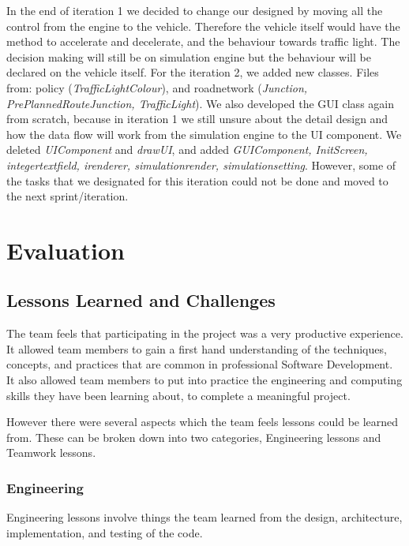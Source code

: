 \documentclass[11pt]{article}
\begin{document}
In the end of iteration 1 we decided to change our designed by moving all the control from the engine to the vehicle. Therefore the vehicle itself would have the method to accelerate and decelerate, and the behaviour towards traffic light. The decision making will still be on simulation engine but the behaviour will be declared on the vehicle itself. 
For the iteration 2, we added new classes. Files from: policy (\textit{TrafficLightColour}), and roadnetwork (\textit{Junction, PrePlannedRouteJunction, TrafficLight}). We also developed the GUI class again from scratch, because in iteration 1 we still unsure about the detail design and how the data flow will work from the simulation engine to the UI component. We deleted \textit{UIComponent} and \textit{drawUI}, and added \textit{GUIComponent, InitScreen, integertextfield, irenderer, simulationrender, simulationsetting}. However, some of the tasks that we designated for this iteration could not be done and moved to the next sprint/iteration.  


\pagebreak
\section{Evaluation} 
\subsection{Lessons Learned and Challenges}

The team feels that participating in the project was a very productive experience. It allowed team members to gain a first hand understanding of the techniques, concepts, and practices that are common in professional Software Development. It also allowed team members to put into practice the engineering and computing skills they have been learning about, to complete a meaningful project. 

However there were several aspects which the team feels lessons could be learned from.
These can be broken down into two categories, Engineering lessons and Teamwork lessons.

\subsubsection{Engineering}

Engineering lessons involve things the team learned from the design, architecture, implementation, and testing of the code.
\end{document}
